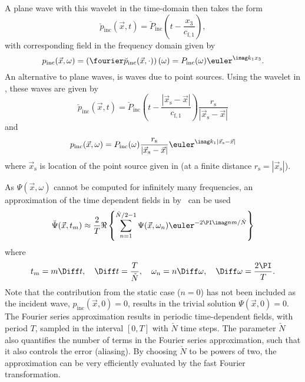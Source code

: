 A plane wave with this wavelet in the time-domain then takes the form
\begin{equation}\label{Eq1:PlaneWaveTimeDomain}
	\breve{p}_{\mathrm{inc}}(\vec{x},t) = \breve{P}_{\mathrm{inc}}\left(t-\frac{x_3}{c_{\mathrm{f},1}}\right),
\end{equation}
with corresponding field in the frequency domain given by
\begin{equation}
	p_{\mathrm{inc}}(\vec{x},\omega)=\left(\fourier\breve{p}_{\mathrm{inc}}(\vec{x},\cdot)\right)(\omega) = P_{\mathrm{inc}}(\omega)\euler^{\imag k_1 x_3}.
\end{equation}
An alternative to plane waves, is waves due to point sources. Using the wavelet in , these waves are given by
\begin{equation}
	\breve{p}_{\mathrm{inc}}(\vec{x},t) = \breve{P}_{\mathrm{inc}}\left(t-\frac{|\vec{x}_{\mathrm{s}}-\vec{x}|}{c_{\mathrm{f},1}}\right)\frac{r_{\mathrm{s}}}{|\vec{x}_{\mathrm{s}}-\vec{x}|}\label{Eq1:P_incOmega}
\end{equation}
and
\begin{equation*}
	p_{\mathrm{inc}}(\vec{x},\omega) = P_{\mathrm{inc}}(\omega)\frac{r_{\mathrm{s}}}{|\vec{x}_{\mathrm{s}}-\vec{x}|}\euler^{\imag k_1 |\vec{x}_{\mathrm{s}}-\vec{x}|}
\end{equation*}
where $\vec{x}_{\mathrm{s}}$ is location of the point source given in  (at a finite distance $r_{\mathrm{s}}=|\vec{x}_{\mathrm{s}}|$). 

As $\Psi(\vec{x},\omega)$ cannot be computed for infinitely many frequencies, an approximation of the time dependent fields in  by~\cite[p. 614]{Jensen2011coa} can be used
\begin{equation}
	\breve{\Psi}(\vec{x},t_m) \approx \frac{2}{T}\Re\left\{\sum_{n=1}^{\check{N}/2-1} \Psi(\vec{x},\omega_n)\euler^{-2\PI\imag n m/\check{N}}\right\}
\end{equation}
where
\begin{equation}
	t_m = m\Diff t, \quad \Diff t = \frac{T}{\check{N}}, \quad \omega_n = n\Diff\omega, \quad \Diff\omega = \frac{2\PI}{T}. 
\end{equation}
Note that the contribution from the static case ($n=0$) has not been included as the incident wave, $p_{\mathrm{inc}}(\vec{x},0) = 0$, results in the trivial solution $\Psi(\vec{x},0)=0$. The Fourier series approximation results in periodic time-dependent fields, with period $T$, sampled in the interval $[0,T]$ with $\check{N}$ time steps. The parameter $\check{N}$ also quantifies the number of terms in the Fourier series approximation, such that it also controls the error (aliasing). By choosing $\check{N}$ to be powers of two, the approximation can be very efficiently evaluated by the fast Fourier transformation. 

